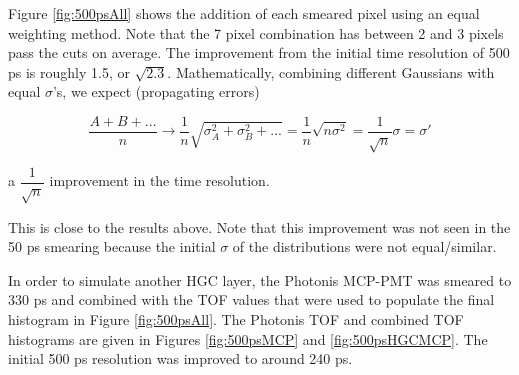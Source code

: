 \documentclass[twocolumn,aps,prd,reprint,superscriptaddress,floatfix]{revtex4-1}
\begin{document}
Figure \ref{fig:500psAll} shows the addition of each smeared pixel using an equal weighting method. 
Note that the 7 pixel combination has between 2 and 3 pixels pass the cuts on average. 
The improvement from the initial time resolution of 500 ps is roughly 1.5, or $\sqrt{2.3}$.
Mathematically, combining different Gaussians with equal $\sigma$'s, we expect (propagating errors)

\[
\dfrac{A+B+...}{n}
\rightarrow
\frac{1}{n}\sqrt{\sigma_A^2+\sigma_B^2+...} =
\frac{1}{n}\sqrt{n \sigma^2} =
\frac{1}{\sqrt{n}} \sigma = 
\sigma'
\]

\centerline{
a $\dfrac{1}{\sqrt{n}}$ improvement in the time resolution.
}

This is close to the results above. 
Note that this improvement was not seen in the 50 ps smearing because the initial $\sigma$ of the distributions were not equal/similar.

In order to simulate another HGC layer, the Photonis MCP-PMT was smeared to 330 ps and combined with the TOF values that were used to populate the final histogram in Figure \ref{fig:500psAll}. 
The Photonis TOF and combined TOF histograms are given in Figures \ref{fig:500psMCP} and \ref{fig:500psHGCMCP}. 
The initial 500 ps resolution was improved to around 240 ps. 
\end{document}
